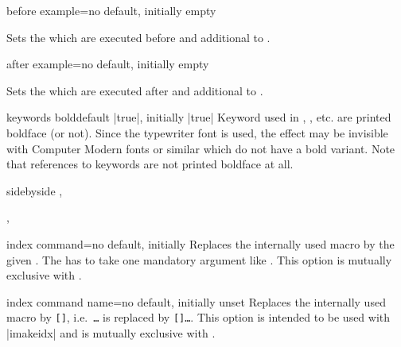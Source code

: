 \begin{docTcbKey}[][doc updated=2015-03-16]{before example}{=}{no default, initially empty}
\smallskip\begin{deprecated}
  Sets the  which are executed before  and 
  additional to .
\end{deprecated}
\end{docTcbKey}

\enlargethispage*{1cm}

\begin{docTcbKey}{after example}{=}{no default, initially empty}
\smallskip\begin{deprecated}
  Sets the  which are executed after  and 
  additional to .
\end{deprecated}
\end{docTcbKey}

\clearpage
\begin{docTcbKey}[][doc new=2017-04-25]{keywords bold}{}{default |true|, initially |true|}
  Keyword used in , , etc. are printed
  boldface (or not). Since the typewriter font is used, the effect may be
  invisible with Computer Modern fonts or similar which do not
  have a bold variant. Note that references to keywords are not printed boldface at all.
\begin{dispExample*}{sidebyside}
\LARGE
{}, 

, 
\end{dispExample*}
\end{docTcbKey}



\begin{docTcbKey}[][doc new=2015-01-09]{index command}{=}{no default, initially }
  Replaces the internally used  macro by the given .
  The  has to take one mandatory argument like .
  This option is mutually exclusive with .
\begin{dispListing}
\end{dispListing}
\end{docTcbKey}


\begin{docTcbKey}[][doc new=2015-01-09]{index command name}{=}{no default, initially unset}
  Replaces the internally used  macro by
  \mbox{\texttt{[]}}, i.e.\ 
  \mbox{\texttt{\textbraceleft\ldots\textbraceright}} is replaced by
  \mbox{\cs{index}\texttt{[\meta{name}]\textbraceleft\ldots\textbraceright}}.
  This option is intended to be used with |imakeidx| and is
  mutually exclusive with .
\begin{dispListing}
\end{dispListing}
\end{docTcbKey}



